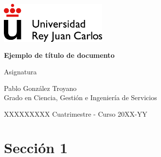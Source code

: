 \documentclass[10pt, a4paper]{article}
\newcommand\asignatura{Asignatura}
\newcommand\DocumentTitle{Ejemplo de título de documento}
\newcommand\mesyanno{XXXXXXXXX Cuatrimestre - Curso 20XX-YY}
\newcommand\autor{Pablo González Troyano}
\newcommand\grado{Grado en Ciencia, Gestión e Ingeniería de Servicios}
\begin{document}
\begin{titlepage}
\includegraphics[width=0.4\textwidth]{URJC_logo.png}
    \begin{center}
        \vspace*{7cm}  
        \Huge
        \textbf{\DocumentTitle}
        
        \vspace{1cm}
        
        \huge{\asignatura}
        \vspace{1.5cm}
        \Large
        \vfill    
        \vspace{1cm}
        \Large
    \end{center}
    {\parindent0pt \autor \\ \grado }
    \begin{flushright}
        \mesyanno
    \end{flushright}
\end{titlepage}
\tableofcontents\newpage

\newpage

\section{Sección 1}
    \lipsum[1-25]


\end{document}
